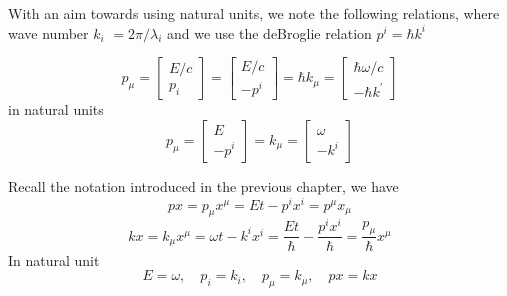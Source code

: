 With an aim towards using natural units, we note the following relations, where wave number $k_{i}$ $=2 \pi / \lambda_{i}$ and we use the deBroglie relation $p^{i}=\hbar k^{i}$
\begin{qt}
    \begin{equation}
p_{\mu}=\left[\begin{array}{c}
{E / c} \\
{p_{i}}
\end{array}\right]=\left[\begin{array}{c}
{E / c} \\
{-p^{i}}
\end{array}\right]=\hbar k_{\mu}=\left[\begin{array}{c}
{\hbar \omega / c} \\
{-\hbar k^{\prime}}
\end{array}\right]
\end{equation}
in natural units
\begin{equation}
p_{\mu}=\left[\begin{array}{c}
{E} \\
{-p^{i}}
\end{array}\right]=k_{\mu}=\left[\begin{array}{c}
{\omega} \\
{-k^{i}}
\end{array}\right]
\end{equation}
\end{qt}
Recall the notation introduced in the previous chapter, we have
\begin{equation}
p x=p_{\mu} x^{\mu}=E t-p^{i} x^{i}=p^{\mu} x_{\mu}
\end{equation}
\begin{equation}
k x=k_{\mu} x^{\mu}=\omega t-k^{i} x^{i}=\frac{E t}{\hbar}-\frac{p^{i} x^{i}}{\hbar}=\frac{p_{\mu}}{\hbar} x^{\mu}
\end{equation}
In natural unit
\begin{equation}
E=\omega, \quad p_{i}=k_{i}, \quad p_{\mu}=k_{\mu}, \quad p x=k x
\end{equation}


